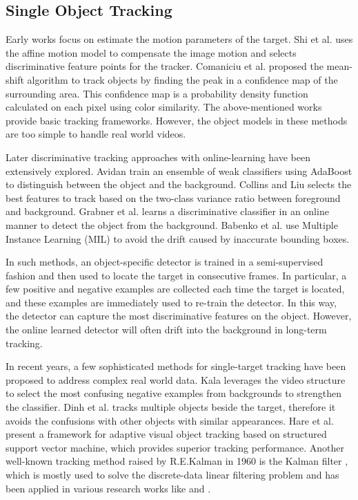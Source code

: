 \subsection{Single Object Tracking}
Early works \cite{broida1986, shi1994} focus on estimate the motion parameters of the target. Shi et al. \cite{shi1994} uses the affine motion model to compensate the image motion and selects discriminative feature points for the tracker. Comaniciu et al. \cite{coman2003} proposed the mean-shift algorithm to track objects by finding the peak in a confidence map of the surrounding area. This confidence map is a probability density function calculated on each pixel using color similarity. The above-mentioned works provide basic tracking frameworks. However, the object models in these methods are too simple to handle real world videos.

Later discriminative tracking approaches with online-learning have been extensively explored. Avidan \cite{avidan2007} train an ensemble of weak classifiers using AdaBoost to distinguish between the object and the background. Collins and Liu \cite{collins2005} selects the best features to
track based on the two-class variance ratio between foreground and background. Grabner et al. \cite{Grabner2006} learns a discriminative classifier in an online manner to detect the object from the background. Babenko et al. \cite{Babenko2009} use Multiple Instance Learning (MIL) to avoid the drift caused by inaccurate bounding boxes.

In such methods, an object-specific detector is trained in a semi-supervised fashion and then used to locate the target in consecutive frames. In particular, a few positive and negative examples are collected each time the target is located, and these examples are immediately used to re-train the detector. In this way, the detector can capture the most discriminative features on the object. However, the online learned detector will often drift into the background in long-term tracking.

In recent years, a few sophisticated methods for single-target tracking have been proposed to address complex real world data. Kala \cite{kalal2010} leverages the video structure to select the most
confusing negative examples from backgrounds to strengthen the classifier. Dinh et al. \cite{dinh2011} tracks multiple objects beside the target, therefore it avoids the confusions with other objects with similar appearances. Hare et al. \cite{hare2016} present a framework for adaptive visual object tracking based on structured support vector machine, which provides superior tracking performance.
Another well-known tracking method raised by R.E.Kalman in 1960 is the Kalman filter \cite{Welch1995}, which is mostly used to solve the discrete-data linear filtering problem and has been applied in various research works like \cite{vasuhi2015} and \cite{Katsarakis2006}.

